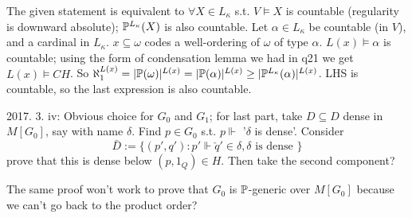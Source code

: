 \documentclass[a4paper]{article}
\begin{document}
The given statement is equivalent to $\forall X \in L_\kappa$ s.t. $V \vDash X$ is countable (regularity is downward absolute); $\P^{L_\kappa}(X)$ is also countable. Let $\alpha \in L_\kappa$ be countable (in $V$), and a  cardinal in $L_{\kappa}$. $x \subseteq \omega$ codes a well-ordering of $\omega$ of type $\alpha$. $L(x) \vDash \alpha$ is countable; using the form of condensation lemma we had in q21 we get $L(x) \vDash CH$. So $\aleph_1^{L(x)} = |\P(\omega)|^{L(x)} = |\P(\alpha)|^{L(x)} \geq 
|\P^{L_\kappa}(\alpha)|^{L(x)}$. LHS is countable, so the last expression is also countable.

2017. 3. iv: Obvious choice for $G_0$ and $G_1$; for last part, take $D \subseteq D$ dense in $M[G_0]$, say with name $\delta$. Find $p \in G_0$ s.t. $p \Vdash$ '$\delta$ is dense'. Consider
\[
\bar{D} := \{(p',q'): p' \Vdash \check{q}' \in \delta, \delta \text{ is dense }\}
\]
prove that this is dense below $(p,1_Q) \in H$. Then take the second component?

The same proof won't work to prove that $G_0$ is $\P$-generic over $M[G_0]$ because we can't go back to the product order?
\end{document}
